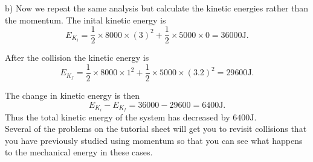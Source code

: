 b) Now we repeat the same analysis but calculate the kinetic energies rather than the momentum. The inital kinetic energy is
\begin{equation*}
E_{K_{i}}=\frac{1}{2}\times 8000\times(3)^2 +\frac{1}{2}\times 5000\times 0=36000\text{J}.
\end{equation*}

After the collision the kinetic energy is
\begin{equation*}
E_{K_{f}}=\frac{1}{2}\times 8000\times 1^{2}+\frac{1}{2}\times 5000\times (3.2)^{2}=29 600\text{J}.
\end{equation*}

The change in kinetic energy is then
\begin{equation*}
E_{K_{i}}-E_{K_{f}}=36000-29600=6400\text{J}.
\end{equation*}
Thus the total kinetic energy of the system has decreased by $6400\text{J}$.\\


Several of the problems on the tutorial sheet will get you to revisit collisions that you have previously studied using momentum so that you can see what happens to the mechanical energy in these cases.